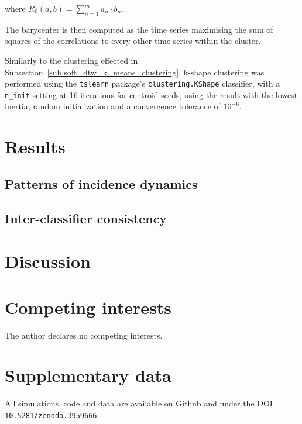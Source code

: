 \documentclass{article}
\begin{document}
\noindent where $R_0(a, b) = \sum_{n = 1}^m a_n \cdot b_n$. 

The barycenter is then computed as the time series maximising the sum of squares of the correlations to every other time series within the cluster. 

Similarly to the clustering effected in Subsection~\ref{sub:soft_dtw_k_means_clustering}, k-shape clustering was performed using the \texttt{tslearn} package's \texttt{clustering.KShape} classifier, with a \texttt{n\_init} setting at 16 iterations for centroid seeds, using the result with the lowest inertia, random initialization and a convergence tolerance of $10^{-6}$.



\section{Results} %
\label{sec:results}

\subsection{Patterns of incidence dynamics} %
\label{sub:patterns_of_incidence_dynamics}




\subsection{Inter-classifier consistency} %
\label{sub:inter_classifier_consistency}



\section{Discussion} %
\label{sec:discussion}


\section*{Competing interests} %
\label{sec:competing_interests}

The author declares no competing interests.


\section*{Supplementary data} %
\label{sec:supplementary_data}

All simulations, code and data are available on Github and under the DOI \texttt{10.5281/zenodo.3959666}.



\end{document}
